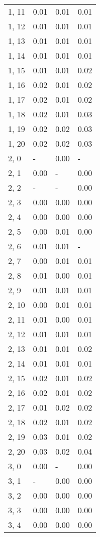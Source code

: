 \begin{table}
\begin{tabular}{llll}
1, 11  &  0.01 &  0.01 &  0.01 \\
1, 12  &  0.01 &  0.01 &  0.01 \\
1, 13  &  0.01 &  0.01 &  0.01 \\
1, 14  &  0.01 &  0.01 &  0.01 \\
1, 15  &  0.01 &  0.01 &  0.02 \\
1, 16  &  0.02 &  0.01 &  0.02 \\
1, 17  &  0.02 &  0.01 &  0.02 \\
1, 18  &  0.02 &  0.01 &  0.03 \\
1, 19  &  0.02 &  0.02 &  0.03 \\
1, 20  &  0.02 &  0.02 &  0.03 \\
2, 0   &     - &  0.00 &     - \\
2, 1   &  0.00 &     - &  0.00 \\
2, 2   &     - &     - &  0.00 \\
2, 3   &  0.00 &  0.00 &  0.00 \\
2, 4   &  0.00 &  0.00 &  0.00 \\
2, 5   &  0.00 &  0.01 &  0.00 \\
2, 6   &  0.01 &  0.01 &     - \\
2, 7   &  0.00 &  0.01 &  0.01 \\
2, 8   &  0.01 &  0.00 &  0.01 \\
2, 9   &  0.01 &  0.01 &  0.01 \\
2, 10  &  0.00 &  0.01 &  0.01 \\
2, 11  &  0.01 &  0.00 &  0.01 \\
2, 12  &  0.01 &  0.01 &  0.01 \\
2, 13  &  0.01 &  0.01 &  0.02 \\
2, 14  &  0.01 &  0.01 &  0.01 \\
2, 15  &  0.02 &  0.01 &  0.02 \\
2, 16  &  0.02 &  0.01 &  0.02 \\
2, 17  &  0.01 &  0.02 &  0.02 \\
2, 18  &  0.02 &  0.01 &  0.02 \\
2, 19  &  0.03 &  0.01 &  0.02 \\
2, 20  &  0.03 &  0.02 &  0.04 \\
3, 0   &  0.00 &     - &  0.00 \\
3, 1   &     - &  0.00 &  0.00 \\
3, 2   &  0.00 &  0.00 &  0.00 \\
3, 3   &  0.00 &  0.00 &  0.00 \\
3, 4   &  0.00 &  0.00 &  0.00 \\

\end{tabular}
\end{table}
